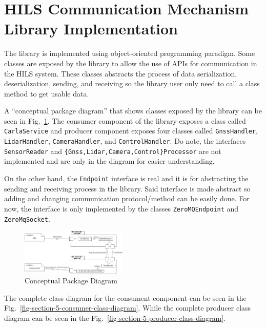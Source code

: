 \section{HILS Communication Mechanism Library Implementation}

The library is implemented using object-oriented programming paradigm. Some
classes are exposed by the library to allow the use of APIs for communication in
the HILS system. These classes abstracts the process of data serialization,
deserialization, sending, and receiving so the library user only need to call a
class method to get usable data.

A ``conceptual package diagram'' that shows classes exposed by the library can
be seen in Fig.~\ref{fig-section-5-conceptual-package-diagram}. The consumer
component of the library exposes a class called \texttt{Car\-la\-Ser\-vice} and
producer component exposes four classes called \texttt{G\-n\-s\-s\-Hand\-ler},
\texttt{Li\-dar\-Hand\-ler}, \texttt{Ca\-me\-ra\-Hand\-ler}, and
\texttt{Con\-trol\-Hand\-ler}. Do note, the interfaces \texttt{SensorReader} and
\texttt{\{Gnss,Lidar,Camera,Control\}Processor} are not implemented and are only
in the diagram for easier understanding.

On the other hand, the \texttt{Endpoint} interface is real and it is for
abstracting the sending and receiving process in the library. Said interface is
made abstract so adding and changing communication protocol/method can be easily
done. For now, the interface is only implemented by the classes
\texttt{ZeroMQEndpoint} and \texttt{ZeroMqSocket}.

\begin{figure}[htbp]
	\centerline{\includegraphics[width=0.45\textwidth]{resources/chapter-4/conceptual-package-diagram.png}}
	\caption{Conceptual Package Diagram}
	\label{fig-section-5-conceptual-package-diagram}
\end{figure}

The complete class diagram for the consument component can be seen in the
Fig.~\ref{fig-section-5-consumer-class-diagram}. While the complete producer class
diagram can be seen in the Fig.~\ref{fig-section-5-producer-class-diagram}.

